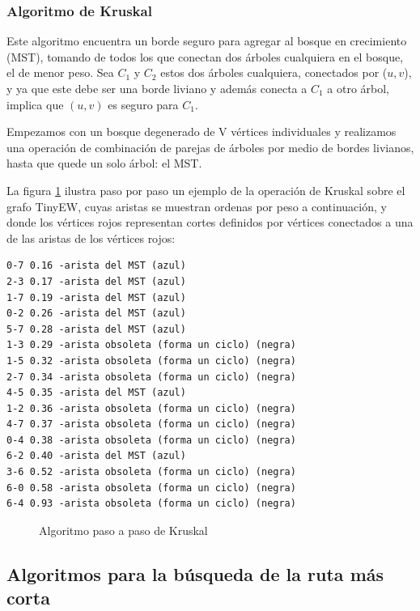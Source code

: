 \documentclass[a4paper, 11pt]{report}
\newcommand{\DrawEJcGraph}[5]{

    \begin{scope}[#5]
    \foreach \pos/\nodo in {{(0,0)/4}, {(0,1.8)/5}, {(1.1,1.3)/7}, {(2.6,2.6)/1}, {(2.6,0.6)/0}, {(4.1,1.3)/2}, {(4.1,2.6)/3}, {(6.6,0)/6}}
        \node[vertex] (#3\nodo) at \pos {\nodo};
    \foreach \start/\end in {4/5, 5/7, 7/1,7/0,0/2,2/3,2/6,4/7,1/5,0/4,1/2,1/3,2/7,3/6,6/0,6/4}
        \path[edge,#5] (#3\start) -- (#3\end);

    \foreach \nodo in {#1}
        \node[selected vertex] at (#3\nodo) {\nodo};

    \begin{pgfonlayer}{background}%
        \foreach \start/\end in {#2}
            \path[rojod edge,#5] (#3\start) -- (#3\end);
    \end{pgfonlayer}
    \begin{pgfonlayer}{background}%
        \foreach \start/\end in {#3}
            \path[rojog edge,#5] (#3\start) -- (#3\end);
    \end{pgfonlayer}
    \begin{pgfonlayer}{background}%
        \foreach \start/\end in {#4}
            \path[azul edge,#5] (#3\start) -- (#3\end);
    \end{pgfonlayer}
    \end{scope}

}
\begin{document}
\subsubsection{Algoritmo de Kruskal}
Este algoritmo encuentra un borde seguro para agregar al bosque en crecimiento (MST), tomando de todos los que conectan dos árboles cualquiera en el bosque, el de menor peso. Sea $C_1$ y $C_2$ estos dos árboles cualquiera, conectados por ($u, v$), y ya que este debe ser una borde liviano y además conecta a $C_1$ a otro árbol, implica que $(u, v)$ es seguro para $C_1$. 

Empezamos con un bosque degenerado de V vértices individuales y realizamos una operación de combinación de parejas de árboles por medio de bordes livianos, hasta que quede un solo árbol: el MST.

La figura \ref{MST5} ilustra paso por paso un ejemplo de la operación de Kruskal sobre el grafo TinyEW, cuyas aristas se muestran ordenas por peso a continuación, y donde los vértices rojos representan cortes definidos por vértices conectados a una de las aristas de los vértices rojos: 

\begin{verbatim}
0-7 0.16 -arista del MST (azul)
2-3 0.17 -arista del MST (azul)
1-7 0.19 -arista del MST (azul)
0-2 0.26 -arista del MST (azul)
5-7 0.28 -arista del MST (azul)
1-3 0.29 -arista obsoleta (forma un ciclo) (negra) 
1-5 0.32 -arista obsoleta (forma un ciclo) (negra)
2-7 0.34 -arista obsoleta (forma un ciclo) (negra)
4-5 0.35 -arista del MST (azul)
1-2 0.36 -arista obsoleta (forma un ciclo) (negra)
4-7 0.37 -arista obsoleta (forma un ciclo) (negra)
0-4 0.38 -arista obsoleta (forma un ciclo) (negra)
6-2 0.40 -arista del MST (azul)
3-6 0.52 -arista obsoleta (forma un ciclo) (negra)
6-0 0.58 -arista obsoleta (forma un ciclo) (negra)
6-4 0.93 -arista obsoleta (forma un ciclo) (negra)
\end{verbatim}

\begin{figure}[!h]
    \caption{Algoritmo paso a paso de Kruskal}
    \label{MST5}
\end{figure}

\newpage
\subsection{Algoritmos para la b\'usqueda de la ruta m\'as corta}
\end{document}
